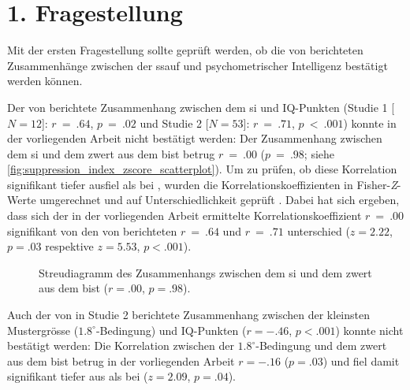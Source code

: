 \documentclass[11pt, twoside, a4paper]{book}		%
\begin{document}
\clearpage
\section{1. Fragestellung}

Mit der ersten Fragestellung sollte geprüft werden, ob die von \citet{Melnick2013} berichteten Zusammenhänge zwischen der \gls{ssauf} und psychometrischer Intelligenz bestätigt werden können. 

Der von \citet{Melnick2013} berichtete Zusammenhang zwischen dem \gls{si} und IQ-Punkten (Studie 1 [$N=12$]: $r~=~.64$, $p~=~.02$ und Studie 2 [$N=53$]: $r~=~.71$, $p~<~.001$) konnte in der vorliegenden Arbeit nicht bestätigt werden: Der Zusammenhang zwischen dem \gls{si} und dem \gls{zwert} aus dem \gls{bist} betrug $r~=~.00$ ($p~=~.98$; siehe \autoref{fig:suppression_index_zscore_scatterplot}). 
Um zu prüfen, ob diese Korrelation signifikant tiefer ausfiel als bei \citeauthor{Melnick2013}, wurden die Korrelationskoeffizienten in Fisher-\textit{Z}-Werte umgerechnet und  auf Unterschiedlichkeit geprüft \citep[][S. 54]{Cohen1983}. 
Dabei hat sich ergeben, dass sich der in der vorliegenden Arbeit ermittelte Korrelationskoeffizient $r~=~.00$ signifikant von den von \citet{Melnick2013} berichteten $r~=~.64$ und $r~=~.71$ unterschied ($z=2.22$, $p=.03$ respektive $z=5.53$, $p<.001$).

\begin{figure}[t]
	\centering
	\begin{adjustbox}{width=1\textwidth}
		
	\end{adjustbox}
	\caption[Zusammenhang zwischen dem \gls{si} und \gls{zwert} des \gls{bist}s]{Streudiagramm des Zusammenhangs zwischen dem \gls{si} und dem \gls{zwert} aus dem \gls{bist} ($r=.00$, $p=.98$).}
	\label{fig:suppression_index_zscore_scatterplot}
\end{figure}

Auch der von \citet{Melnick2013} in Studie 2 berichtete Zusammenhang zwischen der kleinsten Mustergrösse ($1.8^{\circ}$-Bedingung) und IQ-Punkten ($r=-.46$, $p<.001$) konnte nicht bestätigt werden: Die Korrelation zwischen der $1.8^{\circ}$-Bedingung und dem \gls{zwert} aus dem \gls{bist} betrug in der vorliegenden Arbeit $r=-.16$ ($p=.03$) und fiel damit signifikant tiefer aus als bei \citeauthor{Melnick2013} ($z=2.09$, $p=.04$).
\end{document}
